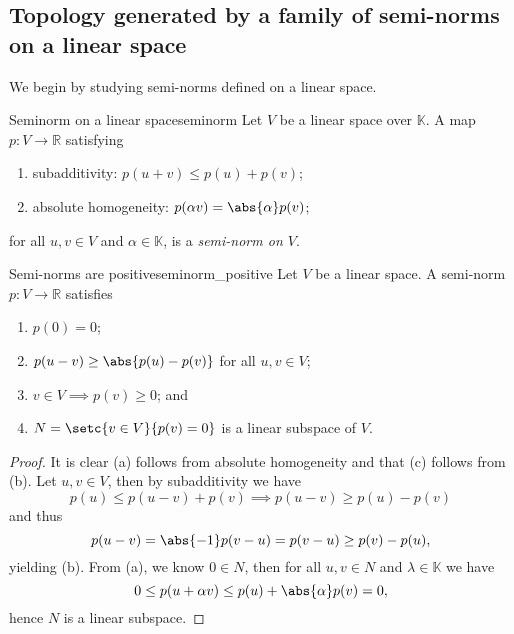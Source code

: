 \subsection{Topology generated by a family of semi-norms on a linear space}
We begin by studying semi-norms defined on a linear space.
\begin{definition}{Seminorm on a linear space}{seminorm}
    Let \(V\) be a linear space over \(\mathbb{K}\). A map \(p : V \to \mathbb{R}\) satisfying
    \begin{enumerate}[label=(\alph*)]
        \item subadditivity: \(p(u + v) \leq p(u) + p(v)\);
        \item absolute homogeneity: \(p(\alpha v) = \abs{\alpha} p(v)\);
    \end{enumerate}
    for all \(u,v \in V\) and \(\alpha \in \mathbb{K}\), is a \emph{semi-norm on \(V\)}.
\end{definition}

\begin{proposition}{Semi-norms are positive}{seminorm_positive}
    Let \(V\) be a linear space. A semi-norm \(p : V \to \mathbb{R}\) satisfies 
    \begin{enumerate}[label=(\alph*)]
        \item \(p(0) = 0\);
        \item \(p(u - v) \geq \abs{p(u) - p(v)}\) for all \(u, v \in V\);
        \item \(v \in V \implies p(v) \geq 0\); and
        \item \(N = \setc{v \in V}{p(v) = 0}\) is a linear subspace of \(V\).
    \end{enumerate}
\end{proposition}
\begin{proof}
    It is clear (a) follows from absolute homogeneity and that (c) follows from (b). Let \(u, v \in V\), then by subadditivity we have
    \begin{equation*}
        p(u) \leq p(u - v) + p(v) \implies p(u - v) \geq p(u) - p(v)
    \end{equation*}
    and thus
    \begin{equation*}
        p(u - v) = \abs{-1} p(v - u) = p(v - u) \geq p(v) - p(u),
    \end{equation*}
    yielding (b). From (a), we know \(0 \in N\), then for all \(u, v \in N\) and \(\lambda \in \mathbb{K}\) we have
    \begin{equation*}
        0 \leq p(u + \alpha v) \leq p(u) + \abs{\alpha} p(v) = 0,
    \end{equation*}
    hence \(N\) is a linear subspace.
\end{proof}

